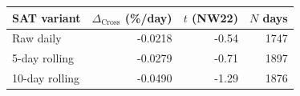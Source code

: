 \begin{tabular}{lrrr}
\toprule
SAT variant & $\Delta_\text{Cross}$ (\%/day) & $t$ (NW22) & $N$ days \\
\midrule
Raw daily & -0.0218 & -0.54 & 1747 \\
5-day rolling & -0.0279 & -0.71 & 1897 \\
10-day rolling & -0.0490 & -1.29 & 1876 \\
\bottomrule
\end{tabular}